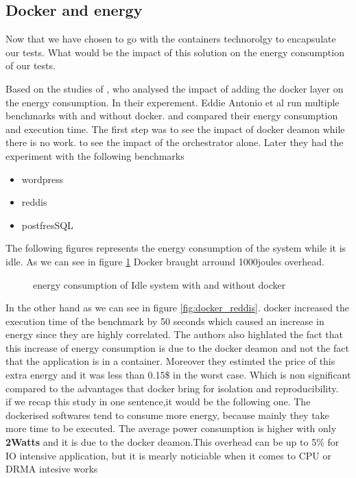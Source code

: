 \subsection{Docker and energy}
Now that we have chosen to go with the containers technorolgy to encapsulate our tests. What would be the impact of this solution on the energy consumption of our tests.

Based on the studies of \cite{santos2018does}, who analysed the impact of adding the docker layer on the energy consumption.
In their experement. Eddie Antonio et al run multiple benchmarks with and without docker. and compared their energy consumption and execution time.
The first step was to see the impact of docker deamon while there is no work. to see the impact of the orchestrator alone. Later they had the experiment with the following benchmarks
\begin{itemize}
    \item wordpress
    \item reddis
    \item postfresSQL
\end{itemize}
The following figures represents the energy consumption of the system while it is idle. As we can see  in figure \ref{fig:docker_idle} Docker braught arround 1000joules overhead.
\begin{figure}
    \caption{energy consumption of Idle system with and without docker \cite{santos2018does}}\label{fig:docker_idle}
\end{figure}
In the other hand as we can see in figure \ref{fig:docker_reddis}. docker increased the execution time of the benchmark by 50 seconds which caused an increase in energy since they are highly correlated.
The authors also highlated the fact that this increase of energy consumption is due to the docker deamon and not the fact that the application is in a container. Moreover they estimted the price of this extra energy and it was less than 0.15\$ in the worst case. Which is non significant compared to the advantages that docker bring for isolation and reproducibility.\\
if we  recap this study in one sentence,it would be the following one.
The dockerised softwares tend to consume more energy, because mainly they take more time to be executed.
The average power consumption is higher with only \textbf{2Watts} and it is due to the docker deamon.This overhead can be up to 5\% for IO intensive application, but it is mearly noticiable when it comes to CPU or DRMA intesive works



